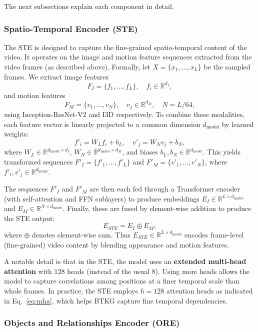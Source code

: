 The next subsections explain each component in detail.

\subsubsection{Spatio-Temporal Encoder (STE)}

The STE is designed to capture the fine-grained spatio-temporal content of the video. It operates on the image and motion feature sequences extracted from the video frames (as described above). Formally, let $X=\{x_1,\dots,x_L\}$ be the sampled frames. We extract image features
$$
F_I = \{f_1,\dots,f_L\}, \quad f_i\in\mathbb{R}^{d_I},
$$
and motion features
$$
F_M = \{v_1,\dots,v_N\}, \quad v_j\in\mathbb{R}^{d_M}, \quad N = L/64,
$$
using Inception-ResNet-V2 and I3D respectively. To combine these modalities, each feature vector is linearly projected to a common dimension $d_{\text{model}}$ by learned weights:
$$
f'_i = W_L f_i + b_L,\quad v'_j = W_N v_j + b_N,
$$
where $W_L\in\mathbb{R}^{d_{\text{model}}\times d_I}$, $W_N\in\mathbb{R}^{d_{\text{model}}\times d_M}$, and biases $b_L,b_N\in\mathbb{R}^{d_{\text{model}}}$. This yields transformed sequences $F'_I = \{f'_1,\dots,f'_L\}$ and $F'_M = \{v'_1,\dots,v'_N\}$, where $f'_i, v'_j \in \mathbb{R}^{d_{\text{model}}}$.

The sequences $F'_I$ and $F'_M$ are then each fed through a Transformer encoder (with self-attention and FFN sublayers) to produce embeddings $E_I \in\mathbb{R}^{L\times d_{\text{model}}}$ and $E_M \in\mathbb{R}^{N\times d_{\text{model}}}$. Finally, these are fused by element-wise addition to produce the STE output:
$$
E_{STE} = E_I \oplus E_M,
$$
where $\oplus$ denotes element-wise sum. Thus $E_{STE}\in\mathbb{R}^{L\times d_{\text{model}}}$ encodes frame-level (fine-grained) video content by blending appearance and motion features.

A notable detail is that in the STE, the model uses an \textbf{extended multi-head attention} with 128 heads (instead of the usual 8). Using more heads allows the model to capture correlations among positions at a finer temporal scale than whole frames. In practice, the STE employs $h=128$ attention heads as indicated in Eq.~\ref{eq:mha}, which helps BTKG capture fine temporal dependencies.

\subsubsection{Objects and Relationships Encoder (ORE)}

